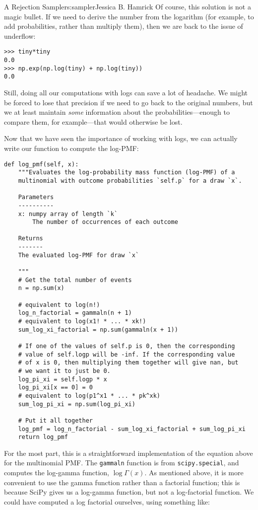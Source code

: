 \begin{aosachapter}{A Rejection Sampler}{s:sampler}{Jessica B. Hamrick}
Of course, this solution is not a magic bullet. If we need to derive the
number from the logarithm (for example, to add probabilities, rather
than multiply them), then we are back to the issue of underflow:

\begin{verbatim}
>>> tiny*tiny
0.0
>>> np.exp(np.log(tiny) + np.log(tiny))
0.0
\end{verbatim}

Still, doing all our computations with logs can save a lot of headache.
We might be forced to lose that precision if we need to go back to the
original numbers, but we at least maintain \emph{some} information about
the probabilities---enough to compare them, for example---that would
otherwise be lost.

\label{writing-the-pmf-code}

Now that we have seen the importance of working with logs, we can
actually write our function to compute the log-PMF:

\begin{verbatim}
def log_pmf(self, x):
    """Evaluates the log-probability mass function (log-PMF) of a
    multinomial with outcome probabilities `self.p` for a draw `x`.

    Parameters
    ----------
    x: numpy array of length `k`
        The number of occurrences of each outcome

    Returns
    -------
    The evaluated log-PMF for draw `x`

    """
    # Get the total number of events
    n = np.sum(x)

    # equivalent to log(n!)
    log_n_factorial = gammaln(n + 1)
    # equivalent to log(x1! * ... * xk!)
    sum_log_xi_factorial = np.sum(gammaln(x + 1))

    # If one of the values of self.p is 0, then the corresponding
    # value of self.logp will be -inf. If the corresponding value
    # of x is 0, then multiplying them together will give nan, but
    # we want it to just be 0.
    log_pi_xi = self.logp * x
    log_pi_xi[x == 0] = 0
    # equivalent to log(p1^x1 * ... * pk^xk)
    sum_log_pi_xi = np.sum(log_pi_xi)

    # Put it all together
    log_pmf = log_n_factorial - sum_log_xi_factorial + sum_log_pi_xi
    return log_pmf
\end{verbatim}

For the most part, this is a straightforward implementation of the
equation above for the multinomial PMF. The \texttt{gammaln} function is
from \texttt{scipy.special}, and computes the log-gamma function,
$\log{\Gamma(x)}$. As mentioned above, it is more convenient to use the
gamma function rather than a factorial function; this is because SciPy
gives us a log-gamma function, but not a log-factorial function. We
could have computed a log factorial ourselves, using something like:


\end{aosachapter}
